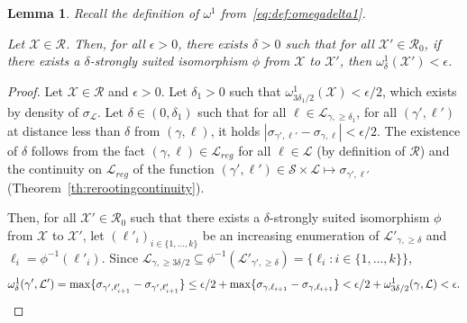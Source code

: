 \documentclass[11pt]{article}
\newtheorem{lemma}[theorem]{Lemma}
\def\Conf{{\mathscr{R}}}
\begin{document}
\begin{lemma}
  \label{le:omega1bound}
  Recall the definition of $\omega^1$ from~\eqref{eq:def:omegadelta1}.

  Let $\mathcal{X}\in \Conf$. Then, for all $\epsilon>0$, there exists $\delta>0$ such that for all $\mathcal{X}'\in \Conf_0$, if there exists a $\delta$-strongly suited isomorphism $\phi$  from $\mathcal{X}$ to $\mathcal{X}'$, then $\omega^1_\delta(\mathcal{X}')<\epsilon$.
\end{lemma}
\begin{proof}
  Let $\mathcal{X}\in \Conf$ and $\epsilon>0$. Let $\delta_1>0$ such that $\omega^1_{3 \delta_1/2}(\mathcal{X})<\epsilon/2$, which exists by density of $\sigma_{\mathcal{L}}$.
  Let $\delta \in(0, \delta_1)$ such that for all $\ell\in \mathcal{L}_{\gamma,\geq \delta_1}$, for all $(\gamma',\ell')$ at distance less than $\delta$ from $(\gamma,\ell)$, it holds $|\sigma_{\gamma',\ell'}-\sigma_{\gamma,\ell}|<\epsilon/2$. The existence of $\delta$ follows from the fact $(\gamma,\ell)\in \mathscr{L}_{reg}$ for all $\ell \in \mathcal{L}$ (by definition of $\Conf$)
  and the continuity on $\mathscr{L}_{reg}$ of the function $(\gamma',\ell')\in \mathscr{S}\times\mathscr{L}\mapsto \sigma_{\gamma',\ell'}$  (Theorem~\ref{th:rerootingcontinuity}).

  Then, for all $\mathcal{X}'\in \Conf_0$ such that there exists a $\delta$-strongly suited isomorphism $\phi$  from $\mathcal{X}$ to $\mathcal{X}'$,
  let $(\ell'_i)_{i\in \{1,\dots, k\}}$ be an increasing enumeration of $\mathcal{L}'_{\gamma,\geq \delta}$ and $\ell_i=\phi^{-1}(\ell'_i)$. Since $\mathcal{L}_{\gamma,\geq 3\delta/2}\subseteq \phi^{-1}(\mathcal{L}'_{\gamma',\geq \delta})=\{ \ell_i: i\in \{1,\dots, k\} \}$,
  \[
  \omega_\delta^1(\gamma',\mathcal{L}')= \max \{ \sigma_{\gamma',\ell'_{i+1}}- \sigma_{\gamma',\ell'_{i+1}}\}\leq \epsilon/2+
  \max \{ \sigma_{\gamma,\ell_{i+1}}- \sigma_{\gamma,\ell_{i+1}}\}< \epsilon/2+ \omega_{3\delta/2}^1(\gamma,\mathcal{L})<\epsilon.\qedhere
  \]
\end{proof}
\end{document}
